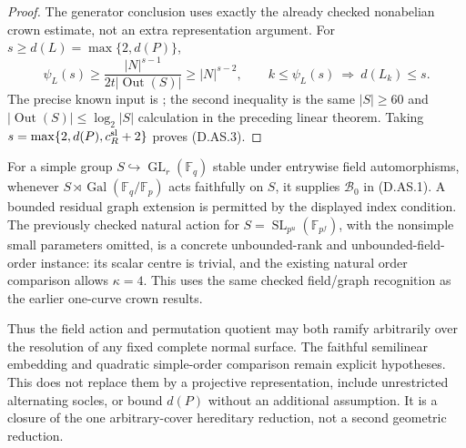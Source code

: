 \begin{proof}
The generator conclusion uses exactly the already checked
nonabelian crown estimate, not an extra representation
argument. For $s\ge d(L)=\max\{2,d(P)\}$,
\[
 \psi_L(s)\ge\frac{|N|^{s-1}}
                        {2t|\operatorname{Out}(S)|}
             \ge |N|^{s-2},\qquad
 k\le\psi_L(s)\ \Longrightarrow\ d(L_k)\le s.
                                                            \tag{D.AS.6}
\]
The precise known input is
\citet[Proposition 2.6(ii), equations (2.1)--(2.2),
pp.~11--13]{LucchiniMarionTracey2020D}; the second
inequality is the same $|S|\ge60$ and
$|\operatorname{Out}(S)|\le\log_2|S|$ calculation
in the preceding linear theorem. Taking
$s=\max\{2,d(P),c_R^{\rm sl}+2\}$ proves (D.AS.3).
\end{proof}

\begin{remark}
For a simple group $S\hookrightarrow\operatorname{GL}_r(\mathbb F_q)$
stable under entrywise field automorphisms, whenever
$S\rtimes\operatorname{Gal}(\mathbb F_q/\mathbb F_p)$
acts faithfully on $S$, it supplies $\mathcal B_0$ in
(D.AS.1). A bounded residual graph extension is permitted
by the displayed index condition. The previously checked
natural action for
$S=\operatorname{SL}_{p^u}(\mathbb F_{p^f})$, with the
nonsimple small parameters omitted, is a concrete
unbounded-rank and unbounded-field-order instance:
its scalar centre is trivial, and the existing natural
order comparison allows $\kappa=4$.
This uses the same checked field/graph recognition as
the earlier one-curve crown results.

Thus the field action and permutation quotient may both
ramify arbitrarily over the resolution of any fixed
complete normal surface. The faithful semilinear
embedding and quadratic simple-order comparison remain
explicit hypotheses. This does not replace them by a
projective representation, include unrestricted
alternating socles, or bound $d(P)$ without an additional
assumption. It is a closure of the one arbitrary-cover
hereditary reduction, not a second geometric reduction.
\end{remark}
